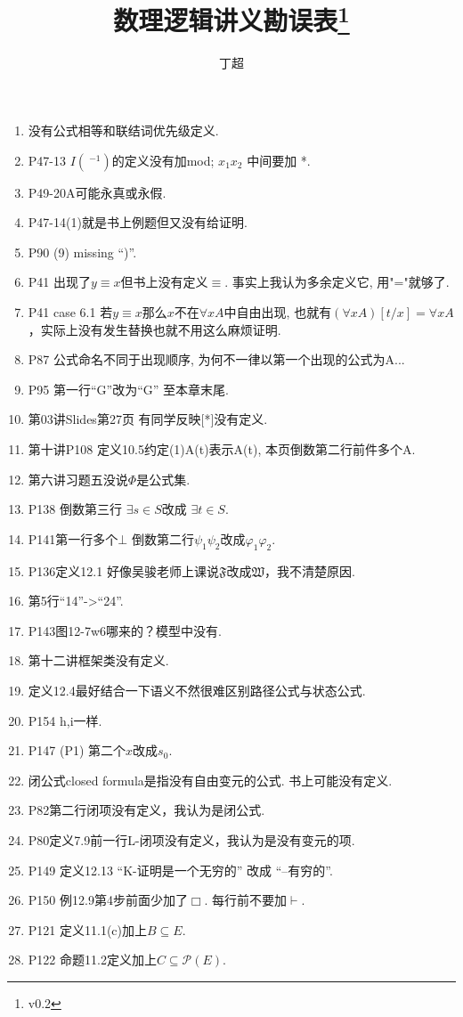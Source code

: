 \documentclass{article}
\begin{document}
\title{数理逻辑讲义勘误表\footnote{v0.2}}
\author{丁超}
\maketitle	
\begin{enumerate}
\item 没有公式相等和联结词优先级定义. 
\item P47-13 $I(~^{-1})$的定义没有加mod; $x_1x_2$ 中间要加 *. 
\item P49-20A可能永真或永假. 
\item P47-14(1)就是书上例题但又没有给证明. 
\item P90 (9) missing ``)''. 
\item P41 出现了$y\equiv x$但书上没有定义$\equiv$. 事实上我认为多余定义它, 用"="就够了. 
\item P41 case 6.1 若$y\equiv x$那么$x$不在$\forall xA$中自由出现, 也就有$(\forall xA)[t/x] = \forall xA$，实际上没有发生替换也就不用这么麻烦证明. 
\item P87 公式命名不同于出现顺序, 为何不一律以第一个出现的公式为A...
\item P95 第一行``G''改为``G'' 至本章末尾. 
\item 第03讲Slides第27页 有同学反映[*]没有定义. 
\item 第十讲P108 定义10.5约定(1)A(t)表示A(t), 本页倒数第二行前件多个A. 
\item 第六讲习题五没说$\Phi$是公式集. 
\item P138 倒数第三行 $\exists s \in S$改成 $\exists t \in S$. 
\item P141第一行多个$\bot$ 倒数第二行$\psi_1 \psi_2$改成$\varphi_1 \varphi_2$. 
\item P136定义12.1 好像吴骏老师上课说$\mathfrak{F}$改成$\mathfrak{W}$，我不清楚原因. 
\item 第5行``14”->``24”. 
\item P143图12-7w6哪来的？模型中没有. 
\item 第十二讲框架类没有定义. 


\item 定义12.4最好结合一下语义不然很难区别路径公式与状态公式. 
\item P154 h,i一样. 
\item P147 (P1) 第二个$x$改成$s_0$. 
\item 闭公式closed formula是指没有自由变元的公式. 书上可能没有定义. 
\item P82第二行闭项没有定义，我认为是闭公式. 
\item P80定义7.9前一行L-闭项没有定义，我认为是没有变元的项. 
\item P149 定义12.13 ``K-证明是一个无穷的'' 改成 ``--有穷的''. 
\item P150 例12.9第4步前面少加了$\Box$. 每行前不要加$\vdash$. 
\item P121 定义11.1(c)加上$B\subseteq E$. 
\item P122 命题11.2定义加上$C\subseteq \mathcal{P}(E)$. 
\end{enumerate}
\end{document}
